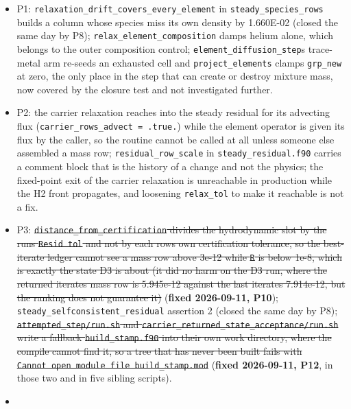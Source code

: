 \documentclass[english,a4paper]{my_memo}
\providecommand{\tightlist}{\setlength{\itemsep}{0pt}\setlength{\parskip}{0pt}}
\begin{document}
\begin{itemize}
\tightlist
\item
  P1: \texttt{relaxation\_drift\_covers\_every\_element} in \texttt{steady\_species\_rows}
  builds a column whose species miss its own density by 1.660E-02 (closed
  the same day by P8); \texttt{relax\_element\_composition} damps helium alone, which
  belongs to the outer composition control; \texttt{element\_diffusion\_step}\textquotesingle s
  trace-metal arm re-seeds an exhausted cell and \texttt{project\_elements} clamps
  \texttt{grp\_new} at zero, the only place in the step that can create or destroy
  mixture mass, now covered by the closure test and not investigated
  further.
\item
  P2: the carrier relaxation reaches into the steady residual for its
  advecting flux (\texttt{carrier\_rows\_advect\ =\ .true.}) while the element operator
  is given its flux by the caller, so the routine cannot be called at all
  unless someone else assembled a mass row; \texttt{residual\_row\_scale} in
  \texttt{steady\_residual.f90} carries a comment block that is the history of a
  change and not the physics; the fixed-point exit of the carrier relaxation
  is unreachable in production while the H2 front propagates, and loosening
  \texttt{relax\_tol} to make it reachable is not a fix.
\item
  P3: \st{\mbox{\texttt{distance\_from\_certification}} divides the hydrodynamic slot by the
  run\textquotesingle s \mbox{\texttt{Resid\ tol}} and not by each row\textquotesingle s own certification tolerance, so
  the best-iterate ledger cannot see a mass row above 3e-12 while \mbox{\texttt{\textbar{}\textbar{}R\textbar{}\textbar{}}} is
  below 1e-8, which is exactly the state D3 is about (it did no harm on the
  D3 run, where the returned iterate\textquotesingle s mass row is 5.945e-12 against the
  last iterate\textquotesingle s 7.914e-12, but the ranking does not guarantee it)}
  (\textbf{fixed 2026-09-11, P10});
  \texttt{steady\_selfconsistent\_residual} assertion 2 (closed the same day by P8);
  \st{\mbox{\texttt{attempted\_step/run.sh}} and \mbox{\texttt{carrier\_returned\_state\_acceptance/run.sh}}
  write a fallback \mbox{\texttt{build\_stamp.f90}} into their own work directory, where
  the compile cannot find it, so a tree that has never been built fails with
  \mbox{\texttt{Cannot\ open\ module\ file\ \textquotesingle{}build\_stamp.mod\textquotesingle{}}}} (\textbf{fixed 2026-09-11, P12},
  in those two and in five sibling scripts).
\item

\end{itemize}
\end{document}
